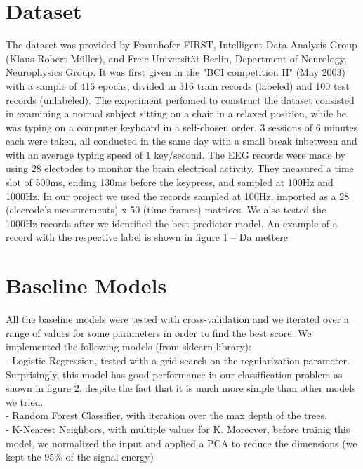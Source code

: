 \documentclass[10pt,conference,compsocconf]{IEEEtran}
\begin{document}
\section{Dataset}
\label{sec:data-analysis}
The dataset was provided by Fraunhofer-FIRST, Intelligent Data Analysis Group (Klaus-Robert Müller), and Freie Universität Berlin, Department of Neurology, Neurophysics Group. It was first given in the "BCI competition II" (May 2003) with a sample of 416 epochs, divided in 316 train records (labeled) and 100 test records (unlabeled).
The experiment perfomed to construct the dataset consisted in examining a normal subject sitting on a chair in a relaxed position, while he was typing on a computer keyboard in a self-chosen order. 3 sessions of 6 minutes each were taken, all conducted in the same day with a small break inbetween and with an average typing speed of 1 key/second. The EEG records were made by using 28 electodes to monitor the brain electrical activity. They measured a time slot of 500ms, ending 130ms before the keypress, and sampled at 100Hz and 1000Hz. 
In our project we used the records sampled at 100Hz, imported as a 28 (elecrode's measurements) x 50 (time frames) matrices. We also tested the 1000Hz records after we identified the best predictor model.
An example of a record with the respective label is shown in figure 1 -- Da mettere


\section{Baseline Models}
\label{sec:baseline}
All the baseline models were tested with cross-validation and we iterated over a range of values for some parameters in order to find the best score.
We implemented the following models (from sklearn library):\\
- Logistic Regression, tested with a grid search on the regularization parameter. Surprisingly, this model has good performance in our classification problem as shown in figure 2, despite the fact that it is much more simple than other models we tried.\\
- Random Forest Classifier, with iteration over the max depth of the trees.\\
- K-Nearest Neighbors, with multiple values for K. Moreover, before trainig this model, we normalized the input and applied a PCA to reduce the dimensions (we kept the 95\% of the signal energy)\\
\end{document}
